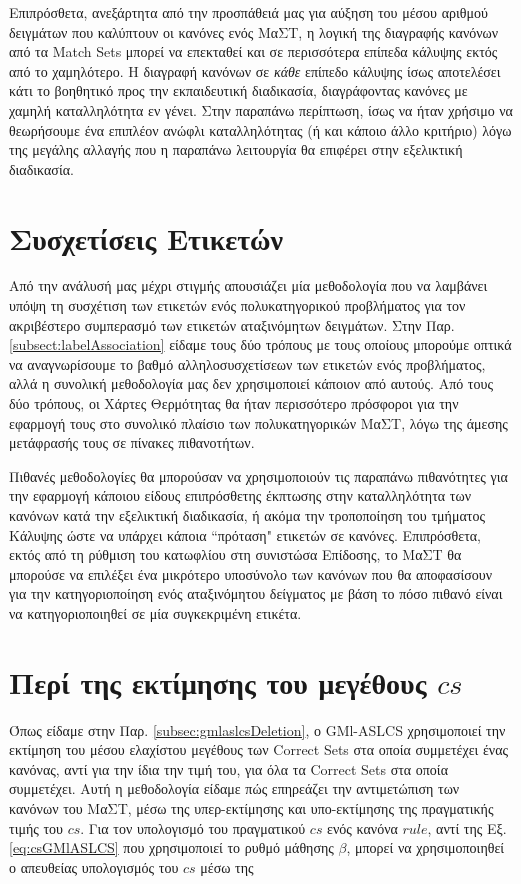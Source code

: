 Επιπρόσθετα, ανεξάρτητα από την προσπάθειά μας για αύξηση του μέσου αριθμού δειγμάτων που καλύπτουν οι κανόνες ενός ΜαΣΤ, η λογική της διαγραφής κανόνων από τα Match Sets μπορεί να επεκταθεί και σε περισσότερα επίπεδα κάλυψης εκτός από το χαμηλότερο. Η διαγραφή κανόνων σε \emph{κάθε} επίπεδο κάλυψης ίσως αποτελέσει κάτι το βοηθητικό προς την εκπαιδευτική διαδικασία, διαγράφοντας κανόνες με χαμηλή καταλληλότητα εν γένει. Στην παραπάνω περίπτωση, ίσως να ήταν χρήσιμο να θεωρήσουμε ένα επιπλέον ανώφλι καταλληλότητας (ή και κάποιο άλλο κριτήριο) λόγω της μεγάλης αλλαγής που η παραπάνω λειτουργία θα επιφέρει στην εξελικτική διαδικασία.


\section{Συσχετίσεις Ετικετών}
Από την ανάλυσή μας μέχρι στιγμής απουσιάζει μία μεθοδολογία που να λαμβάνει υπόψη τη συσχέτιση των ετικετών ενός πολυκατηγορικού προβλήματος για τον ακριβέστερο συμπερασμό των ετικετών αταξινόμητων δειγμάτων. Στην Παρ. \ref{subsect:labelAssociation} είδαμε τους δύο τρόπους με τους οποίους μπορούμε οπτικά να αναγνωρίσουμε το βαθμό αλληλοσυσχετίσεων των ετικετών ενός προβλήματος, αλλά η συνολική μεθοδολογία μας δεν χρησιμοποιεί κάποιον από αυτούς. Από τους δύο τρόπους, οι Χάρτες Θερμότητας θα ήταν περισσότερο πρόσφοροι για την εφαρμογή τους στο συνολικό πλαίσιο των πολυκατηγορικών ΜαΣΤ, λόγω της άμεσης μετάφρασής τους σε πίνακες πιθανοτήτων. 

Πιθανές μεθοδολογίες θα μπορούσαν να χρησιμοποιούν τις παραπάνω πιθανότητες για την εφαρμογή κάποιου είδους επιπρόσθετης έκπτωσης στην καταλληλότητα των κανόνων κατά την εξελικτική διαδικασία, ή ακόμα την τροποποίηση του τμήματος Κάλυψης ώστε να υπάρχει κάποια “πρόταση" ετικετών σε κανόνες. Επιπρόσθετα, εκτός από τη ρύθμιση του κατωφλίου στη συνιστώσα Επίδοσης, το ΜαΣΤ θα μπορούσε να επιλέξει ένα μικρότερο υποσύνολο των κανόνων που θα αποφασίσουν για την κατηγοριοποίηση ενός αταξινόμητου δείγματος με βάση το πόσο πιθανό είναι να κατηγοριοποιηθεί σε μία συγκεκριμένη ετικέτα.



\section{Περί της εκτίμησης του μεγέθους $cs$}
Όπως είδαμε στην Παρ. \ref{subsec:gmlaslcsDeletion}, ο GMl-ASLCS χρησιμοποιεί την εκτίμηση του μέσου ελαχίστου μεγέθους των Correct Sets στα οποία συμμετέχει ένας κανόνας, αντί για την ίδια την τιμή του, για όλα τα Correct Sets στα οποία συμμετέχει. Αυτή η μεθοδολογία είδαμε πώς επηρεάζει την αντιμετώπιση των κανόνων του ΜαΣΤ, μέσω της υπερ-εκτίμησης και υπο-εκτίμησης της πραγματικής τιμής του $cs$. Για τον υπολογισμό του πραγματικού $cs$ ενός κανόνα $rule$, αντί της Εξ. \ref{eq:csGMlASLCS} που χρησιμοποιεί το ρυθμό μάθησης $\beta$, μπορεί να χρησιμοποιηθεί ο απευθείας υπολογισμός του $cs$ μέσω της

